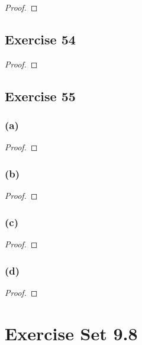 \documentclass[14pt]{extarticle}
\begin{document}
\begin{proof}

\end{proof}

\subsection{Exercise 54}

\begin{proof}

\end{proof}

\subsection{Exercise 55}

\subsubsection{(a)}

\begin{proof}

\end{proof}

\subsubsection{(b)}

\begin{proof}

\end{proof}

\subsubsection{(c)}

\begin{proof}

\end{proof}

\subsubsection{(d)}

\begin{proof}

\end{proof}

\section{Exercise Set 9.8}
\end{document}
